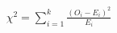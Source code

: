 \documentclass[10pt]{article}
\begin{document}
\begin{align*}\chi^2 = \sum_{i=1}^k{\frac{(O_i - E_i)^2}{E_i}}\end{align*}
\end{document}
